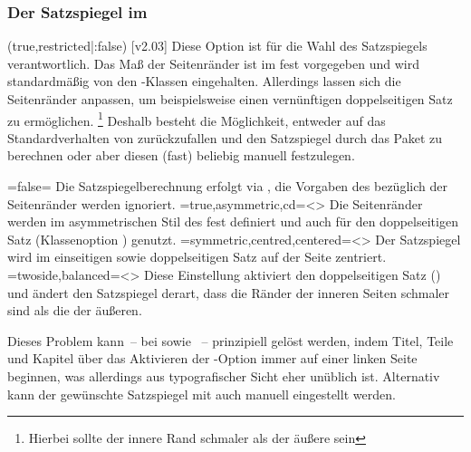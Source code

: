 \begin{DeclareEntity*}{}
\begin{DeclareEntity*}{}
\begin{DeclareEntity*}{}
\subsubsection{Der Satzspiegel im \TUDCD}
%
\begin{Declaration}
  {}
  (true,restricted|:false)
  [v2.03]
Diese Option ist für die Wahl des Satzspiegels verantwortlich. Das Maß der 
Seitenränder ist im \CD fest vorgegeben und wird standardmäßig von den 
\TUDScript-Klassen eingehalten. Allerdings lassen sich die Seitenränder 
anpassen, um beispielsweise einen vernünftigen doppelseitigen Satz zu 
ermöglichen.%
\footnote{Hierbei sollte der innere Rand schmaler als der äußere sein}
Deshalb besteht die Möglichkeit, entweder auf das Standardverhalten von 
\KOMAScript zurückzufallen und den Satzspiegel durch das Paket 
 zu berechnen oder aber diesen (fast) beliebig manuell 
festzulegen.
\begin{DeclareValues}
\NewDocumentCommand{}%
\itemval=false=
  Die Satzspiegelberechnung erfolgt via , die Vorgaben des 
  \CDs bezüglich der Seitenränder werden ignoriert.
\itemval*=true,asymmetric,cd=<>%
  Die Seitenränder werden im asymmetrischen Stil des \CDs fest definiert und 
  auch für den doppelseitigen Satz (Klassenoption ) 
  genutzt.%
\itemval=symmetric,centred,centered=<>%
  Der Satzspiegel wird im einseitigen sowie doppelseitigen Satz auf der Seite 
  zentriert.%
\itemval=twoside,balanced=<>%
  Diese Einstellung aktiviert den doppelseitigen Satz () 
  und ändert den Satzspiegel derart, dass die Ränder der inneren Seiten 
  schmaler sind als die der äußeren.
  
  Dieses Problem kann~-- bei  sowie ~-- 
  prinzipiell gelöst werden, indem Titel, Teile und Kapitel über das Aktivieren 
  der \KOMAScript-Option  immer auf einer linken Seite 
  beginnen, was allerdings aus typografischer Sicht eher unüblich ist. 
  Alternativ kann der gewünschte Satzspiegel mit  
  auch manuell eingestellt werden.
\end{DeclareValues}


\end{Declaration}
\end{DeclareEntity*}
\end{DeclareEntity*}
\end{DeclareEntity*}
